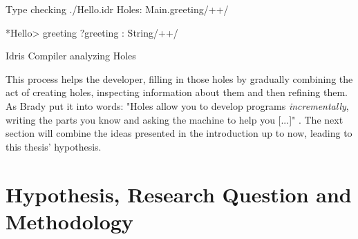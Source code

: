 \begin{program}
\begin{GenericCode}[numbers=none]
Type checking ./Hello.idr
Holes: Main.greeting/+\label{lst:idris-holes-listing}+/

*Hello> greeting
?greeting : String/+\label{lst:idris-holes-types}+/
\end{GenericCode}
\caption{Idris Compiler analyzing Holes}
\label{fig:idris-compiler-holes}
\end{program}

This process helps the developer, filling in those holes by gradually combining the act of creating holes, inspecting information about them and then refining them.
As Brady put it into words: "Holes allow you to develop programs \emph{incrementally}, writing the parts you know and asking the machine to help you [...]" \cite[pp. 21]{brady_type-driven_2017}.
The next section will combine the ideas presented in the introduction up to now, leading to this thesis' hypothesis.

\section{Hypothesis, Research Question and Methodology}
